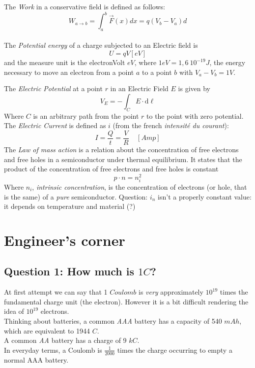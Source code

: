 \documentclass[12pt]{article}
\newcommand{\I}{\textit}
\begin{document}
 The \I{Work} in a conservative field is defined as follows:
		\begin{equation}
			W_{a\to b} = \int_{a}^{b} \overrightarrow{F}(x)dx = q (V_b - V_a)d
		\end{equation}\\
 The \I{Potential energy} of a charge subjected to an Electric field is 
	\begin{equation}
		U = q V [eV]
	\end{equation} and the measure unit is the electronVolt $eV$, where $1 eV = 1,6 \ 10^{-19} J$, the energy necessary to move an electron from a point $a$ to a point $b$ with $V_a-V_b= 1 V$.

The \I{Electric Potential} at a point $r$ in an Electric Field $E$ is given by 
	\begin{equation}
		V_E = -\int_{C}E \cdot \mathrm{d} \boldsymbol{\ell}
	\end{equation}
	Where $C$ is an arbitrary path from the point $r$ to the point with zero potential. \\

 The \I{Electric Current} is defined as $i$ (from the french \I{intensité du courant}):
	\begin{equation}
		I = \frac{Q}{t} = \frac{V}{R} \ \ \ \ \ [Amp]
	\end{equation}
 The \I{Law of mass action} is a relation about the concentration of free electrons and free holes in a semiconductor under thermal equilibrium. It states that the product of the concentration of free electrons and free holes is constant
\begin{equation}
	p\cdot n = n_i^2
\end{equation}
Where $n_i$, \I{intrinsic concentration}, is the concentration of electrons (or hole, that is the same) of a \I{pure} semiconductor.
 Question: $i_n$ isn't a properly constant value: it depends on temperature and material (?)



\newpage
\section{Engineer's corner}
\subsection*{Question 1: How much is $1 C$?} 
At first attempt we can say that 1 $Coulomb$ is \I{very} approximately $10^{19}$ times the fundamental charge unit (the electron). However it is a bit difficult rendering the idea of $10^{19}$ electrons. \\
Thinking about batteries, a common \I{AAA} battery has a capacity of 540 $mAh$, which are equivalent to 1944 $C$. \\
A common \I{AA} battery has a charge of 9 $kC$. \\
In everyday terms, a Coulomb is $\frac{1}{2000}$ times the charge occurring to empty a normal AAA battery.
\end{document}
